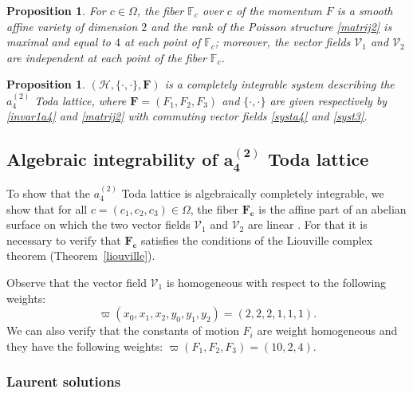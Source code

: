\documentclass[10pt,a4paper]{amsart}
\numberwithin{equation}{section}
\newtheorem{Proposition}[Theorem]{Proposition}
 { \theoremstyle{definition}
\newtheorem{Definition}[Theorem]{Definition}
\newtheorem{Note}[Theorem]{Note}
\newtheorem{Example}[Theorem]{Example}
\newtheorem{Remark}[Theorem]{Remark} }
\begin{document}
\begin{Proposition}
For $c\in \Omega$, the fiber $\mathbb{F}_c$ over $c$ of the momentum
$F$ is a smooth affine variety of dimension $2$ and the rank of the
Poisson structure \eqref{matrij2} is maximal and equal to $4$ at
each point of $\mathbb{F}_c$; moreover, the vector fields
$\mathcal{V}_1$ and $\mathcal{V}_2$ are independent at each point
of the fiber $\mathbb{F}_c$.
\end{Proposition}

\begin{Proposition}
$(\mathcal{H}, \{\cdot,\cdot\},\mathbf{F})$ is a
completely integrable system
 describing the $a_4^{(2)}$ Toda lattice, where
$\mathbf{F}=(F_1,F_2,F_3)$ and $\{\cdot,\cdot\}$ are
given respectively by \eqref{invar1a4} and \eqref{matrij2} with
commuting vector fields \eqref{systa4} and \eqref{syst3}.
\end{Proposition}
\subsection[Algebraic integrability of a\_4\^{}(2) Toda lattice]{Algebraic integrability of $\boldsymbol{a_4^{(2)}}$ Toda lattice}

To show that the $a_4^{(2)}$ Toda lattice is
algebraically completely integrable, we show that for all
$c=(c_1,c_2,c_3)\in \Omega$, the fiber $\mathbf{F_c}$ is
the affine part of an abelian surface on which the two vector fields
$\mathcal{V}_1$ and $\mathcal{V}_2$ are linear \cite{Dehainsala}.
For that it is necessary to verify that $\mathbf{F_c}$
satisfies the conditions of the Liouville complex theorem (Theorem~\ref{liouville}).

 Observe that the vector field $\mathcal{V}_1$ is homogeneous with respect to the following weights:
\[\varpi(x_0,x_1,x_2,y_0,y_1,y_2)=(2,2,2,1,1,1).\]
We can also verify that the constants of motion $F_i$ are weight
homogeneous and they have the following weights:
$\varpi(F_1,F_2,F_3)=(10,2,4).$

\subsubsection{Laurent solutions}
\end{document}
